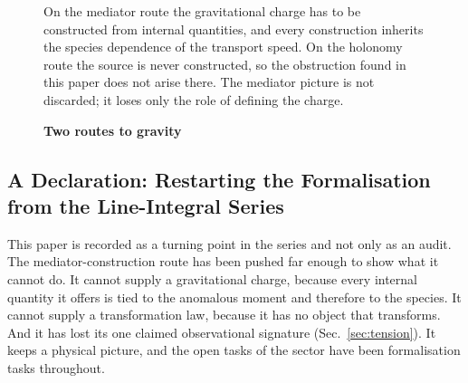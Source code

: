 \documentclass[%
 reprint, amsmath,amssymb, aps, prb, ]{revtex4-2}
\numberwithin{equation}{section}
\newcommand{\vZB}{v_{\text{ZB}}}
\begin{document}
\begin{figure}[t!]
\centering
{}
\caption{\textbf{Two routes to gravity}}
\label{fig:routes}
\vspace{0.4em}
\begin{minipage}{0.95\textwidth}
\justifying\small
On the mediator route the gravitational charge has to be constructed from internal quantities, and every construction inherits the species dependence of the transport speed. On the holonomy route the source is never constructed, so the obstruction found in this paper does not arise there. The mediator picture is not discarded; it loses only the role of defining the charge.
\end{minipage}
\end{figure}

\subsection{A Declaration: Restarting the Formalisation from the Line-Integral Series}
\label{subsec:restart}

This paper is recorded as a turning point in the series and not only as an audit. The mediator-construction route has been pushed far enough to show what it cannot do. It cannot supply a gravitational charge, because every internal quantity it offers is tied to the anomalous moment and therefore to the species. It cannot supply a transformation law, because it has no object that transforms. And it has lost its one claimed observational signature (Sec.~\ref{sec:tension}). It keeps a physical picture, and the open tasks of the sector have been formalisation tasks throughout.
\end{document}
